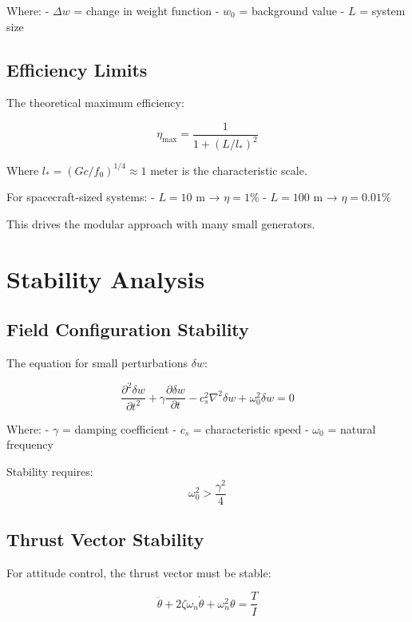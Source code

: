 \documentclass[12pt,letterpaper]{book}
\theoremstyle{definition}
\theoremstyle{plain}
\theoremstyle{remark}
\begin{document}
{{{{{Where:
- $\Delta w$ = change in weight function
- $w_0$ = background value
- $L$ = system size

\subsection{Efficiency Limits}

The theoretical maximum efficiency:

\begin{equation}
\eta_{\max} = \frac{1}{1 + (L/l_*)^2}
\end{equation}

Where $l_* = (Gc/f_0)^{1/4} \approx 1$ meter is the characteristic scale.

For spacecraft-sized systems:
- $L = 10$ m → $\eta = 1\%$
- $L = 100$ m → $\eta = 0.01\%$

This drives the modular approach with many small generators.

\section{Stability Analysis}

\subsection{Field Configuration Stability}

The equation for small perturbations $\delta w$:

\begin{equation}
\frac{\partial^2 \delta w}{\partial t^2} + \gamma \frac{\partial \delta w}{\partial t} - c_s^2 \nabla^2 \delta w + \omega_0^2 \delta w = 0
\end{equation}

Where:
- $\gamma$ = damping coefficient
- $c_s$ = characteristic speed
- $\omega_0$ = natural frequency

Stability requires:
\begin{equation}
\omega_0^2 > \frac{\gamma^2}{4}
\end{equation}

\subsection{Thrust Vector Stability}

For attitude control, the thrust vector must be stable:

\begin{equation}
\ddot{\theta} + 2\zeta\omega_n\dot{\theta} + \omega_n^2\theta = \frac{T}{I}
\end{equation}

}}}}}
\end{document}
